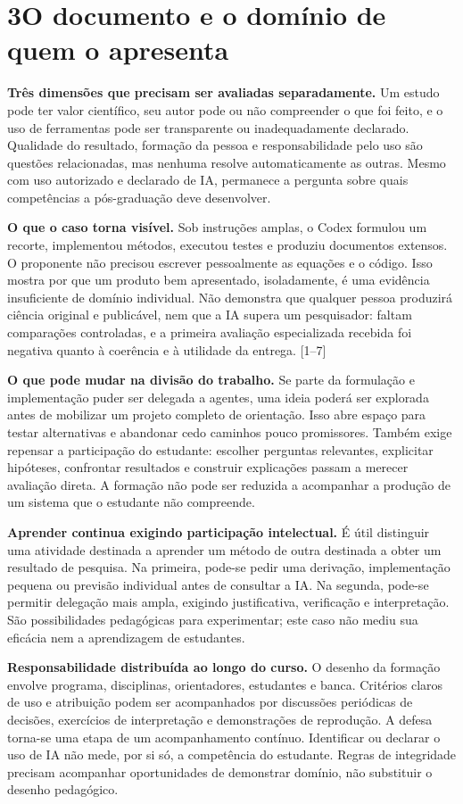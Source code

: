 \documentclass[11pt,a4paper]{article}
\newcommand{\fonte}[1]{{\small\color{navy}[#1]}}
\newcommand{\titulo}[2]{\section*{\color{navy}#1\quad #2}}
\begin{document}
\titulo{3}{O documento e o domínio de quem o apresenta}
\textbf{Três dimensões que precisam ser avaliadas separadamente.} Um estudo pode ter valor científico, seu autor pode ou não compreender o que foi feito, e o uso de ferramentas pode ser transparente ou inadequadamente declarado. Qualidade do resultado, formação da pessoa e responsabilidade pelo uso são questões relacionadas, mas nenhuma resolve automaticamente as outras. Mesmo com uso autorizado e declarado de IA, permanece a pergunta sobre quais competências a pós-graduação deve desenvolver.

\textbf{O que o caso torna visível.} Sob instruções amplas, o Codex formulou um recorte, implementou métodos, executou testes e produziu documentos extensos. O proponente não precisou escrever pessoalmente as equações e o código. Isso mostra por que um produto bem apresentado, isoladamente, é uma evidência insuficiente de domínio individual. Não demonstra que qualquer pessoa produzirá ciência original e publicável, nem que a IA supera um pesquisador: faltam comparações controladas, e a primeira avaliação especializada recebida foi negativa quanto à coerência e à utilidade da entrega. \fonte{1--7}

\textbf{O que pode mudar na divisão do trabalho.} Se parte da formulação e implementação puder ser delegada a agentes, uma ideia poderá ser explorada antes de mobilizar um projeto completo de orientação. Isso abre espaço para testar alternativas e abandonar cedo caminhos pouco promissores. Também exige repensar a participação do estudante: escolher perguntas relevantes, explicitar hipóteses, confrontar resultados e construir explicações passam a merecer avaliação direta. A formação não pode ser reduzida a acompanhar a produção de um sistema que o estudante não compreende.

\textbf{Aprender continua exigindo participação intelectual.} É útil distinguir uma atividade destinada a aprender um método de outra destinada a obter um resultado de pesquisa. Na primeira, pode-se pedir uma derivação, implementação pequena ou previsão individual antes de consultar a IA. Na segunda, pode-se permitir delegação mais ampla, exigindo justificativa, verificação e interpretação. São possibilidades pedagógicas para experimentar; este caso não mediu sua eficácia nem a aprendizagem de estudantes.

\textbf{Responsabilidade distribuída ao longo do curso.} O desenho da formação envolve programa, disciplinas, orientadores, estudantes e banca. Critérios claros de uso e atribuição podem ser acompanhados por discussões periódicas de decisões, exercícios de interpretação e demonstrações de reprodução. A defesa torna-se uma etapa de um acompanhamento contínuo. Identificar ou declarar o uso de IA não mede, por si só, a competência do estudante. Regras de integridade precisam acompanhar oportunidades de demonstrar domínio, não substituir o desenho pedagógico.
\end{document}
